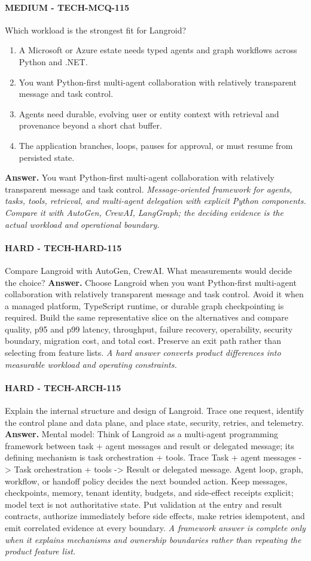 \paragraph{MEDIUM - TECH-MCQ-115} Which workload is the strongest fit for Langroid?
\begin{enumerate}[label=\Alph*.]
\item A Microsoft or Azure estate needs typed agents and graph workflows across Python and .NET.
\item You want Python-first multi-agent collaboration with relatively transparent message and task control.
\item Agents need durable, evolving user or entity context with retrieval and provenance beyond a short chat buffer.
\item The application branches, loops, pauses for approval, or must resume from persisted state.
\end{enumerate}
\textbf{Answer.} You want Python-first multi-agent collaboration with relatively transparent message and task control.
\textit{Message-oriented framework for agents, tasks, tools, retrieval, and multi-agent delegation with explicit Python components. Compare it with AutoGen, CrewAI, LangGraph; the deciding evidence is the actual workload and operational boundary.}
\paragraph{HARD - TECH-HARD-115} Compare Langroid with AutoGen, CrewAI. What measurements would decide the choice?
\textbf{Answer.} Choose Langroid when you want Python-first multi-agent collaboration with relatively transparent message and task control. Avoid it when a managed platform, TypeScript runtime, or durable graph checkpointing is required. Build the same representative slice on the alternatives and compare quality, p95 and p99 latency, throughput, failure recovery, operability, security boundary, migration cost, and total cost. Preserve an exit path rather than selecting from feature lists.
\textit{A hard answer converts product differences into measurable workload and operating constraints.}
\paragraph{HARD - TECH-ARCH-115} Explain the internal structure and design of Langroid. Trace one request, identify the control plane and data plane, and place state, security, retries, and telemetry.
\textbf{Answer.} Mental model: Think of Langroid as a multi-agent programming framework between task + agent messages and result or delegated message; its defining mechanism is task orchestration + tools. Trace Task + agent messages -> Task orchestration + tools -> Result or delegated message. Agent loop, graph, workflow, or handoff policy decides the next bounded action. Keep messages, checkpoints, memory, tenant identity, budgets, and side-effect receipts explicit; model text is not authoritative state. Put validation at the entry and result contracts, authorize immediately before side effects, make retries idempotent, and emit correlated evidence at every boundary.
\textit{A framework answer is complete only when it explains mechanisms and ownership boundaries rather than repeating the product feature list.}
